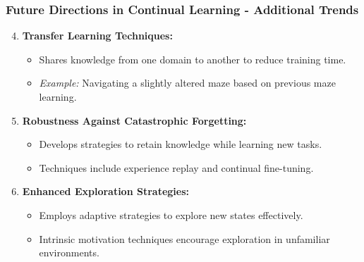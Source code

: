 \documentclass[aspectratio=169]{beamer}
\begin{document}
\begin{frame}[fragile]
    \frametitle{Future Directions in Continual Learning - Additional Trends}
    \begin{enumerate}
        \setcounter{enumi}{3}
        \item \textbf{Transfer Learning Techniques:}
            \begin{itemize}
                \item Shares knowledge from one domain to another to reduce training time.
                \item \textit{Example:} Navigating a slightly altered maze based on previous maze learning.
            \end{itemize}

        \item \textbf{Robustness Against Catastrophic Forgetting:}
            \begin{itemize}
                \item Develops strategies to retain knowledge while learning new tasks.
                \item Techniques include experience replay and continual fine-tuning.
            \end{itemize}

        \item \textbf{Enhanced Exploration Strategies:}
            \begin{itemize}
                \item Employs adaptive strategies to explore new states effectively.
                \item Intrinsic motivation techniques encourage exploration in unfamiliar environments.      
            \end{itemize}
    \end{enumerate}
\end{frame}
\end{document}
